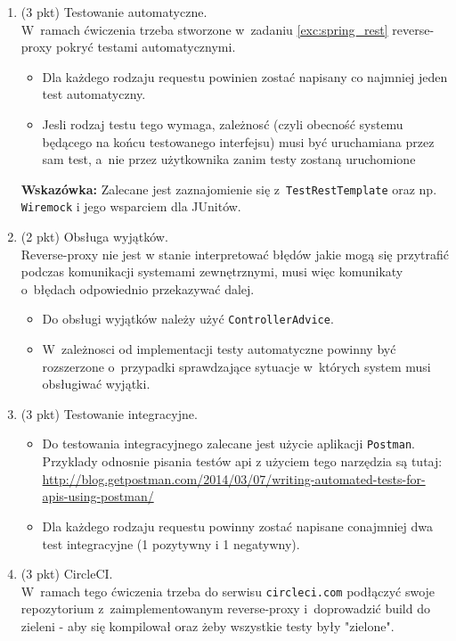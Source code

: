 \documentclass[12pt]{article}
\begin{document}
\begin{enumerate}
        \item\label{exc:spring_rest_test}
            (3 pkt) Testowanie automatyczne.\\
W~ramach ćwiczenia trzeba stworzone w~zadaniu \ref{exc:spring_rest} reverse-proxy pokryć testami automatycznymi.
\begin{itemize}
        \item Dla każdego rodzaju requestu powinien zostać napisany co najmniej jeden test automatyczny.
        \item Jesli rodzaj testu tego wymaga, zależnosć (czyli obecność systemu będącego na końcu testowanego interfejsu) musi być uruchamiana przez sam test, a~nie przez użytkownika zanim testy zostaną uruchomione
\end{itemize}

\textbf{Wskazówka:} Zalecane jest zaznajomienie się z~\texttt{TestRestTemplate} oraz np. \texttt{Wiremock} i jego wsparciem dla JUnitów.

        \item\label{exc:spring_exception_handling}
            (2 pkt) Obsługa wyjątków.\\
Reverse-proxy nie jest w stanie interpretować błędów jakie mogą się przytrafić podczas komunikacji systemami zewnętrznymi, musi więc komunikaty o~błędach odpowiednio przekazywać dalej.
\begin{itemize}
        \item Do obsługi wyjątków należy użyć \texttt{ControllerAdvice}.
        \item W~zależnosci od implementacji testy automatyczne powinny być rozszerzone o~przypadki sprawdzające sytuacje w~których system musi obsługiwać wyjątki.
\end{itemize}

        \item\label{exc:postman}
            (3 pkt) Testowanie integracyjne.\\
\begin{itemize}
        \item Do testowania integracyjnego zalecane jest użycie aplikacji \texttt{Postman}. Przyklady odnosnie pisania testów api z użyciem tego narzędzia są tutaj: \\\url{http://blog.getpostman.com/2014/03/07/writing-automated-tests-for-apis-using-postman/}
        \item Dla każdego rodzaju requestu powinny zostać napisane conajmniej dwa test integracyjne (1 pozytywny i 1 negatywny).
\end{itemize}

        \item\label{exc:travis}
            (3 pkt) CircleCI.\\
W~ramach tego ćwiczenia trzeba do serwisu \texttt{circleci.com} podłączyć swoje repozytorium z~zaimplementowanym reverse-proxy i~doprowadzić build do zieleni - aby się kompilował oraz żeby wszystkie testy były "zielone".

    \end{enumerate}
\end{document}
